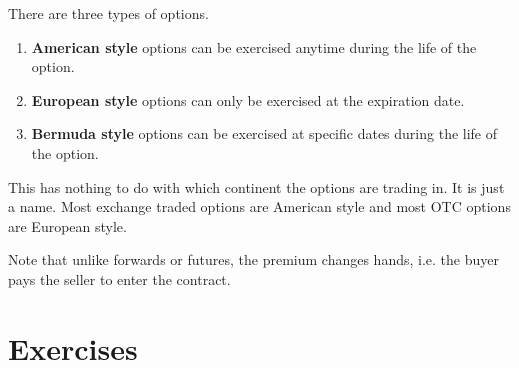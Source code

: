 \documentclass{article}
\begin{document}
\begin{definition}
\begin{enumerate}
\begin{figure}[H]
        \label{fig:put_options}
      \end{figure}
    \end{enumerate}
    There are three types of options. 
    \begin{enumerate}
      \item \textbf{American style} options can be exercised anytime during the life of the option. 
      \item \textbf{European style} options can only be exercised at the expiration date.
      \item \textbf{Bermuda style} options can be exercised at specific dates during the life of the option.
    \end{enumerate}
    This has nothing to do with which continent the options are trading in. It is just a name. Most exchange traded options are American style and most OTC options are European style. 
  \end{definition}

  Note that unlike forwards or futures, the premium changes hands, i.e. the buyer pays the seller to enter the contract.  

\section{Exercises}
\end{document}
